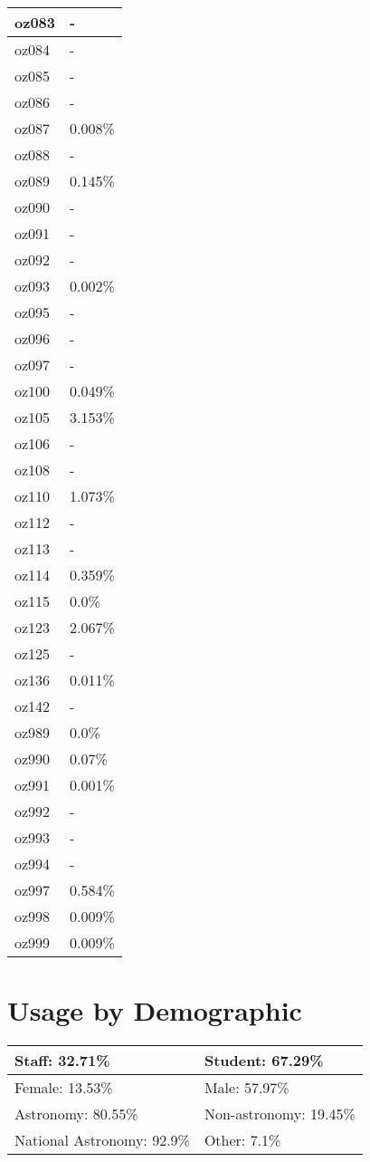\documentclass{article}%
\begin{document}
\begin{longtabu}{X[l] X[r]}
oz083&{-}\\%
\hline%
oz084&{-}\\%
\hline%
oz085&{-}\\%
\hline%
oz086&{-}\\%
\hline%
oz087&0.008\%\\%
\hline%
oz088&{-}\\%
\hline%
oz089&0.145\%\\%
\hline%
oz090&{-}\\%
\hline%
oz091&{-}\\%
\hline%
oz092&{-}\\%
\hline%
oz093&0.002\%\\%
\hline%
oz095&{-}\\%
\hline%
oz096&{-}\\%
\hline%
oz097&{-}\\%
\hline%
oz100&0.049\%\\%
\hline%
oz105&3.153\%\\%
\hline%
oz106&{-}\\%
\hline%
oz108&{-}\\%
\hline%
oz110&1.073\%\\%
\hline%
oz112&{-}\\%
\hline%
oz113&{-}\\%
\hline%
oz114&0.359\%\\%
\hline%
oz115&0.0\%\\%
\hline%
oz123&2.067\%\\%
\hline%
oz125&{-}\\%
\hline%
oz136&0.011\%\\%
\hline%
oz142&{-}\\%
\hline%
oz989&0.0\%\\%
\hline%
oz990&0.07\%\\%
\hline%
oz991&0.001\%\\%
\hline%
oz992&{-}\\%
\hline%
oz993&{-}\\%
\hline%
oz994&{-}\\%
\hline%
oz997&0.584\%\\%
\hline%
oz998&0.009\%\\%
\hline%
oz999&0.009\%\\%
\hline%
\end{longtabu}%
\section{Usage by Demographic}%

%
\begin{longtabu}{X[l] X[l]}%
Staff:  32.71\%&Student:  67.29\%\\%
\hline%
Female:  13.53\%&Male:  57.97\%\\%
\hline%
Astronomy:  80.55\%&Non{-}astronomy:  19.45\%\\%
\hline%
National Astronomy:  92.9\%&Other:  7.1\%\\%
\hline%
\end{longtabu}%
\newpage%
\end{document}
